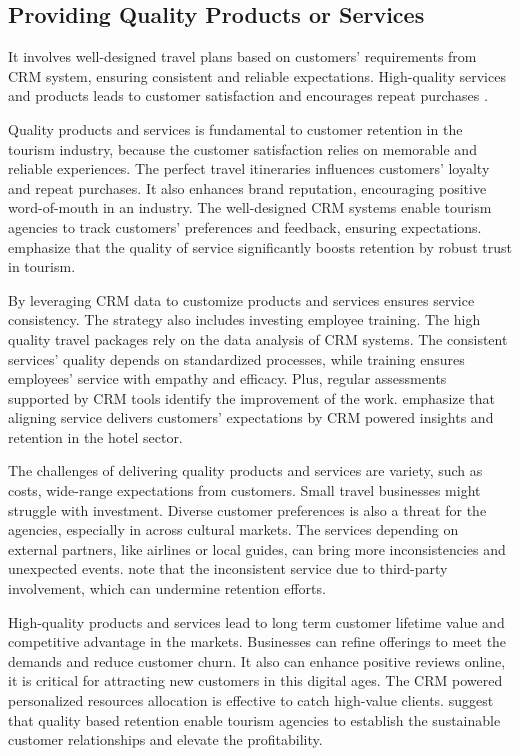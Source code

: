 \subsection{Providing Quality Products or Services}
It involves well-designed travel plans based on customers' requirements from CRM system, ensuring consistent and reliable expectations. High-quality services and products leads to customer satisfaction and encourages repeat purchases \cite{So2023ServiceQuality}. 

Quality products and services is fundamental to customer retention in the tourism industry, because the customer satisfaction relies on memorable and reliable experiences. The perfect travel itineraries influences customers' loyalty and repeat purchases. It also enhances brand reputation, encouraging positive word-of-mouth in an industry. The well-designed CRM systems enable tourism agencies to track customers' preferences and feedback, ensuring expectations. \cite{So2023ServiceQuality} emphasize that the quality of service significantly boosts retention by robust trust in tourism.

By leveraging CRM data to customize products and services ensures service consistency. The strategy also includes investing employee training. The high quality travel packages rely on the data analysis of CRM systems. The consistent services' quality depends on standardized processes, while training ensures employees' service with empathy and efficacy. Plus, regular assessments supported by CRM tools identify the improvement of the work. \cite{Singh2023CustomerSatisfaction} emphasize that aligning service delivers customers' expectations by CRM powered insights and retention in the hotel sector.

The challenges of delivering quality products and services are variety, such as costs, wide-range expectations from customers. Small travel businesses might struggle with investment. Diverse customer preferences is also a threat for the agencies, especially in across cultural markets. The services depending on external partners, like airlines or local guides, can bring more inconsistencies and unexpected events. \cite{TrebickaTartaraj2023PricingStrategy} note that the inconsistent service due to third-party involvement, which can undermine retention efforts.

High-quality products and services lead to long term customer lifetime value and competitive advantage in the markets. Businesses can refine offerings to meet the demands and reduce customer churn. It also can enhance positive reviews online, it is critical for attracting new customers in this digital ages. The CRM powered personalized resources allocation is effective to catch high-value clients. \cite{Devesa2023ServiceQuality} suggest that quality based retention enable tourism agencies to establish the sustainable customer relationships and elevate the profitability.

